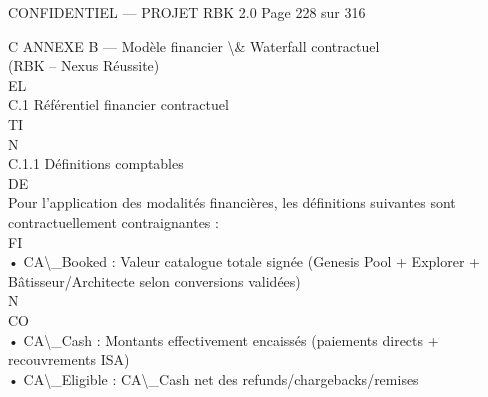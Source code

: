 \vspace{0.5em}
\begin{confidential}CONFIDENTIEL — PROJET RBK 2.0                                       Page 228 sur 316\end{confidential}
C \textbar{} ANNEXE B — Modèle financier \textbackslash{}& Waterfall contractuel\\
(RBK – Nexus Réussite)\\
\vspace{0.5em}
\vspace{0.5em}
\vspace{0.5em}
\vspace{0.5em}
EL\\
C.1 Référentiel financier contractuel\\
\vspace{0.5em}
\vspace{0.5em}
\vspace{0.5em}
\vspace{0.5em}
TI\\
N\\
C.1.1 Définitions comptables\\
\vspace{0.5em}
\vspace{0.5em}
\vspace{0.5em}
\vspace{0.5em}
DE\\
Pour l’application des modalités financières, les définitions suivantes sont contractuellement contraignantes :\\
\vspace{0.5em}
\vspace{0.5em}
\vspace{0.5em}
\vspace{0.5em}
FI\\
• CA\textbackslash{}_Booked : Valeur catalogue totale signée (Genesis Pool + Explorer + Bâtisseur/Architecte selon conversions validées)\\
\vspace{0.5em}
\vspace{0.5em}
N\\
CO\\
• CA\textbackslash{}_Cash : Montants effectivement encaissés (paiements directs + recouvrements ISA)\\
\vspace{0.5em}
• CA\textbackslash{}_Eligible : CA\textbackslash{}_Cash net des refunds/chargebacks/remises\\
\vspace{0.5em}
